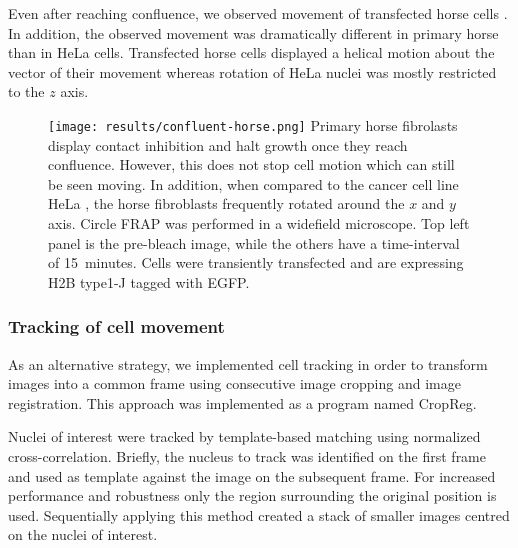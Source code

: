       Even after reaching confluence, we observed movement of transfected horse cells .
      In addition, the observed movement was dramatically different in primary horse than in HeLa cells.
      Transfected horse cells displayed a helical motion about the vector of their movement
      whereas rotation of HeLa nuclei was mostly restricted to the $z$ axis.

      \begin{figure}
        \centering
        \texttt{[image: results/confluent-horse.png]}
          {
            Primary horse fibrolasts display contact inhibition and halt growth
            once they reach confluence. However, this does not stop cell
            motion which can still be seen moving. In addition, when compared
            to the cancer cell line HeLa ,
            the horse fibroblasts frequently rotated around the $x$ and $y$
            axis. Circle FRAP was performed in a widefield microscope.
            Top left panel is the pre-bleach image, while the others have a
            time-interval of 15~minutes. Cells were transiently transfected
            and are expressing H2B type1-J tagged with EGFP.
          }
        \label{fig:kill-frap:confluent-horse}
      \end{figure}

    \subsubsection{Tracking of cell movement}

      As an alternative strategy, we implemented cell tracking
      in order to transform images into a common frame using
      consecutive image cropping and image registration.
      This approach was implemented as a program named CropReg.

      Nuclei of interest were tracked by template-based matching using normalized cross-correlation.
      Briefly, the nucleus to track was identified on the first frame and
      used as template against the image on the subsequent frame.
      For increased performance and robustness only the region surrounding the original position is used.
      Sequentially applying this method created a stack of smaller images centred on the nuclei of interest.

